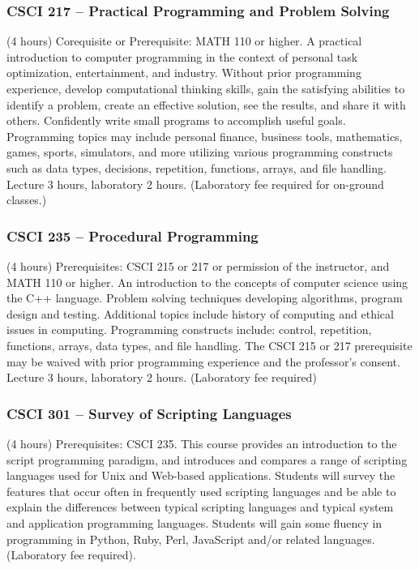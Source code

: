 \subsubsection{CSCI 217 -- Practical Programming and Problem Solving}
(4 hours) Corequisite or Prerequisite: MATH 110 or higher. A practical introduction to computer programming in the context of personal task optimization, entertainment, and industry. Without prior programming experience, develop computational thinking skills, gain the satisfying abilities to identify a problem, create an effective solution, see the results, and share it with others. Confidently write small programs to accomplish useful goals. Programming topics may include personal finance, business tools, mathematics, games, sports, simulators, and more utilizing various programming constructs such as data types, decisions, repetition, functions, arrays, and file handling. Lecture 3 hours, laboratory 2 hours. (Laboratory fee required for on-ground classes.)

\subsubsection{CSCI 235 -- Procedural Programming}
(4 hours) Prerequisites: CSCI 215 or 217 or permission of the instructor, and MATH 110 or higher. An introduction to the concepts of computer science using the C++ language. Problem solving techniques developing algorithms, program design and testing. Additional topics include history of computing and ethical issues in computing. Programming constructs include: control, repetition, functions, arrays, data types, and file handling. The CSCI 215 or 217 prerequisite may be waived with prior programming experience and the professor’s consent. Lecture 3 hours, laboratory 2 hours. (Laboratory fee required)

\subsubsection{CSCI 301 -- Survey of Scripting Languages}
(4 hours) Prerequisites: CSCI 235. This course provides an introduction to the script programming paradigm, and introduces and compares a range of scripting languages used for Unix and Web-based applications. Students will survey the features that occur often in frequently used scripting languages and be able to explain the differences between typical scripting languages and typical system and application programming languages. Students will gain some fluency in programming in Python, Ruby, Perl, JavaScript and/or related languages. (Laboratory fee required).

